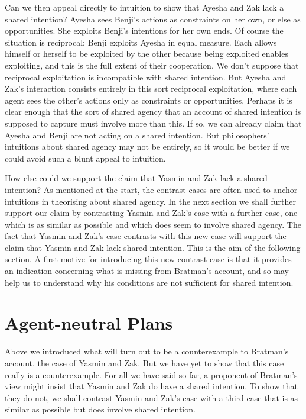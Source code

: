 \documentclass[12pt,\papersize]{extarticle}
\begin{document}
Can we then appeal directly to intuition to show that Ayesha and Zak lack a shared intention?
Ayesha sees Benji's actions as constraints on her own, or else as opportunities.
She exploits Benji's intentions for her own ends.
Of course the situation is reciprocal: Benji exploits Ayesha in equal measure.
Each allows himself or herself to be exploited by the other because being exploited enables exploiting,
and this is the full extent of their cooperation. 
We don't suppose that reciprocal exploitation is incompatible with shared intention. 
But Ayesha and Zak's interaction consists entirely in this sort reciprocal exploitation, where each agent sees the other's actions only as constraints or opportunities.
Perhaps it is clear enough that 
the sort of shared agency that an account of shared intention is supposed to capture must involve more than this. 
If so, we can already claim that Ayesha and Benji are not acting on a shared intention.
But philosophers' intuitions about shared agency may not be entirely, so it would be better if we could avoid such a blunt appeal to intuition.

How else could we support the claim that Yasmin and Zak lack a shared intention? 
As mentioned at the start, 
the contrast cases are often used to anchor intuitions in theorising about shared agency.
In the next section we shall further support our claim by contrasting Yasmin and Zak's case with a further case, one which is as similar as possible and which does seem to involve shared agency.
The fact that Yasmin and Zak's case contrasts with this new case will support the claim that Yasmin and Zak lack shared intention.
This is the aim of the following section.
A first motive for introducing this new contrast case is that it provides an indication concerning what is missing from Bratman's account, and so may help us to understand why his conditions are not sufficient for shared intention.



\section{Agent-neutral Plans}

Above we introduced what will turn out to be a counterexample to Bratman's account, the case of Yasmin and Zak. 
But we have yet to show that this case really is a counterexample. 
For all we have said so far, a proponent of Bratman's view might insist that Yasmin and Zak do have a shared intention.
To show that they do not,
we shall contrast Yasmin and Zak's case with a third case that is as similar as possible but does involve shared intention. 
\end{document}
